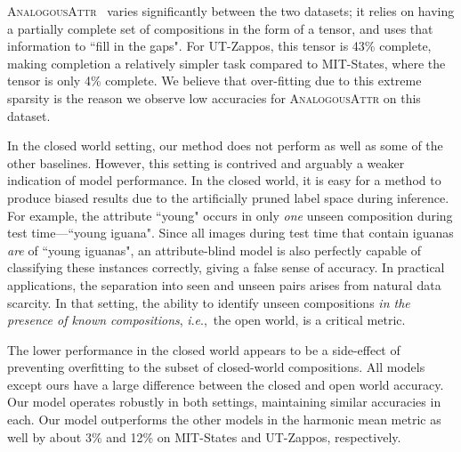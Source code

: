\documentclass[runningheads]{llncs}
\newcommand{\SC}[1]{{\textsc{#1}}}
\newcommand{\ie}{\textit{i}.\textit{e}.,~}
\begin{document}
\SC{AnalogousAttr}~\cite{chen2014inferring} varies significantly between the two datasets; it relies on having a partially complete set of compositions in the form of a tensor, and uses that information to ``fill in the gaps". For UT-Zappos, this tensor is 43\% complete, making completion a relatively simpler task compared to MIT-States, where the tensor is only 4\% complete. We believe that over-fitting due to this extreme sparsity is the reason we observe low accuracies for \SC{AnalogousAttr} on this dataset.

In the closed world setting, our method does not perform as well as some of the other baselines.  However, this setting is contrived and arguably a weaker indication of model performance.  In the closed world, it is easy for a method to produce biased results due to the artificially pruned label space during inference. For example, the attribute ``young" occurs in only \emph{one} unseen composition during test time---``young iguana". Since all images during test time that contain iguanas \emph{are} of ``young iguanas", an attribute-blind model is also perfectly capable of classifying these instances correctly, giving a false sense of accuracy. In practical applications, the separation into seen and unseen pairs arises from natural data scarcity. In that setting, the ability to identify unseen compositions \emph{in the presence of known compositions}, \ie the open world, is a critical metric. 

The lower performance in the closed world appears to be a side-effect of preventing overfitting to the subset of closed-world compositions. All models except ours have a large difference between the closed and open world accuracy. Our model operates robustly in both settings, maintaining similar accuracies in each. Our model outperforms the other models in the harmonic mean metric as well by about 3\% and 12\% on MIT-States and UT-Zappos, respectively.
\end{document}
